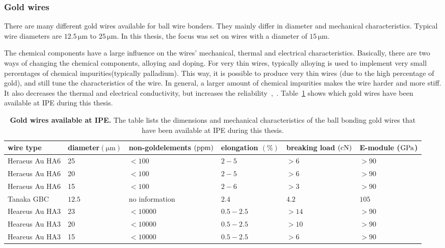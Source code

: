 \subsubsection{Gold wires}\label{sec:wires}
There are many different gold wires available for ball wire bonders. They mainly differ in diameter and mechanical characteristics. Typical wire diameters are $12.5\,\si{\micro \meter}$ to $25\,\si{\micro \meter}$. In this thesis, the focus was set on wires with a diameter of $15\,\si{\micro \meter}$. 

The chemical components have a large influence on the wires' mechanical, thermal and electrical characteristics. Basically, there are two ways of changing the chemical components, alloying and doping. For very thin wires, typically alloying is used to implement very small percentages of chemical impurities(typically palladium). This way, it is possible to produce very thin wires (due to the high percentage of gold), and still tune the characteristics of the wire. In general, a larger amount of chemical impurities makes the wire harder and more stiff. It also decreases the thermal and electrical conductivity, but increases the reliability~\cite{Her12a},~\cite{Her12b}. Table~\ref{tab:wires} shows which gold wires have been available at \ac{IPE} during this thesis.
\begin{table}
\caption[Gold wires available at IPE]{\textbf{Gold wires available at \ac{IPE}.} The table lists the dimensions and mechanical characteristics of the ball bonding gold wires that have been available at \ac{IPE} during this thesis.}\label{tab:wires}
\begin{center}
\begin{tabular}{@{}p{28mm}p{15mm}p{26mm}p{16mm}p{16mm}p{18mm}}
\toprule
wire type&diameter\newline$(\si{\micro \meter})$&non-gold\newline elements $(\rm{ppm})$&elongation $(\% )$&breaking load $(\rm{cN})$&E-module ($\rm{GPa}$)\\
\midrule
Heraeus Au HA6&25&$<100$&$2-5$&$>6$&$>90$\\
Heraeus Au HA6&20&$<100$&$2-5$&$>6$&$>90$\\
Heraeus Au HA6&15&$<100$&$2-6$&$>3$&$>90$\\
Tanaka GBC&$12.5$&no information&$2.4$&$4.2$&$105$\\
Heareus Au HA3&23&$<10000$&$0.5-2.5$&$>14$&$>90$\\
Heareus Au HA3&20&$<10000$&$0.5-2.5$&$>10$&$>90$\\
Heareus Au HA3&15&$<10000$&$0.5-2.5$&$>6$&$>90$\\
\bottomrule
\end{tabular}
\end{center}
\end{table}

